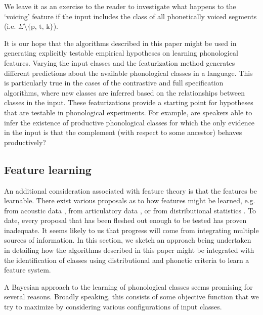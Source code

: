 \documentclass[11pt, oneside]{article}   	%
\begin{document}
We leave it as an exercise to the reader to investigate what happens to the `voicing' feature if the input includes the class of all phonetically voiced segments (i.e. $\Sigma \setminus \text{\{p, t, k\}}$).

It is our hope that the algorithms described in this paper might be used in generating explicitly testable empirical hypotheses on learning phonological features. Varying the input classes and the featurization method generates different predictions about the available phonological classes in a language. This is particularly true in the cases of the contrastive and full specification algorithms, where new classes are inferred based on the relationships between classes in the input. These featurizations provide a starting point for hypotheses that are testable in phonological experiments. For example, are speakers able to infer the existence of productive phonological classes for which the only evidence in the input is that the complement (with respect to some ancestor) behaves productively? 

\subsection{Feature learning}


An additional consideration associated with feature theory is that the features be learnable. There exist various proposals as to how features might be learned, e.g. from acoustic data \cite{TODO}, from articulatory data \cite{TODO}, or from distributional statistics \cite{TODO}. To date, every proposal that has been fleshed out enough to be tested has proven inadequate. It seems likely to us that progress will come from integrating multiple sources of information. In this section, we sketch an approach being undertaken in  detailing how the algorithms described in this paper might be integrated with the identification of classes using distributional and phonetic criteria to learn a feature system.

A Bayesian approach to the learning of phonological classes seems promising for several reasons. Broadly speaking, this consists of some objective function that we try to maximize by considering various configurations of input classes. 
\end{document}

